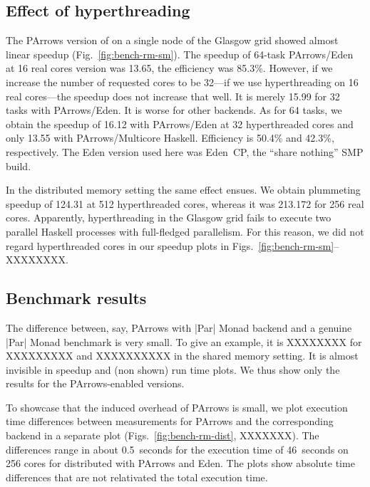 \subsection{Effect of hyperthreading}

The PArrows version of \rmtest on a single node of the Glasgow grid
showed almost linear speedup (Fig.~\ref{fig:bench-rm-sm}). The speedup
of 64-task PArrows/Eden at 16 real cores version was 13.65, the
efficiency was 85.3\%.  However, if we increase the number of
requested cores to be 32---\ie if we use hyperthreading on 16 real
cores---the speedup does not increase that well. It is merely 15.99
for 32 tasks with PArrows/Eden. It is worse for other backends.  As
for 64 tasks, we obtain the speedup of 16.12 with PArrows/Eden at 32
hyperthreaded cores and only 13.55 with PArrows/Multicore
Haskell. Efficiency is 50.4\% and 42.3\%, respectively. The Eden
version used here was Eden~CP, the ``share nothing'' SMP build.

In the distributed memory setting the same effect ensues. We obtain
plummeting speedup of 124.31 at 512 hyperthreaded cores, whereas it was
213.172 for 256 real cores. Apparently, hyperthreading in the Glasgow
grid fails to execute two parallel Haskell processes with full-fledged
parallelism. For this reason, we did not regard hyperthreaded cores in
our speedup plots in Figs.~\ref{fig:bench-rm-sm}--XXXXXXXX.




\subsection{Benchmark results}

The difference between, say, PArrows with |Par| Monad backend and a
genuine |Par|
Monad benchmark is very small. To give an example, it is XXXXXXXX for
XXXXXXXXX and XXXXXXXXXX in the shared memory setting. It is almost invisible in speedup and
(non shown) run time plots. We thus show only the results for the
PArrows-enabled versions.

To showcase that the induced overhead of
PArrows is small, we plot execution time differences between measurements for
PArrows and the corresponding backend in a separate plot
(Figs.~\ref{fig:bench-rm-dist}, XXXXXXX). The differences range in
about 0.5~seconds for the execution time of 46~seconds on 256 cores
for distributed \rmtest with PArrows and Eden. The plots show absolute
time differences that are not relativated \wrt the total execution time.

